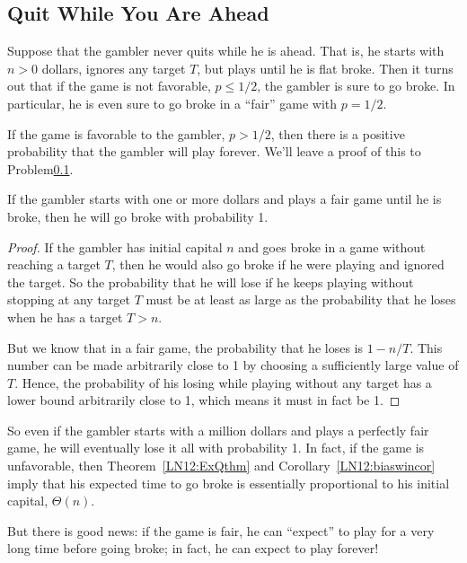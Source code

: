 \begin{editingnotes}

\subsection{Quit While You Are Ahead}

Suppose that the gambler never quits while he is ahead.  That is, he
starts with $n>0$ dollars, ignores any target $T$, but plays until he is
flat broke.  Then it turns out that if the game is not favorable, \ie $p
\leq 1/2$, the gambler is sure to go broke.  In particular, he is even
sure to go broke in a ``fair'' game with $p = 1/2$.

If the game is favorable to the gambler, \ie $p>1/2$, then there is a
positive probability that the gambler will play forever.  We'll leave a
proof of this to Problem\ref{}.

\begin{lemma}\label{LN12:go broke}
If the gambler starts with one or more dollars and plays a fair game until
he is broke, then he will go broke with probability 1.
\end{lemma}

\begin{proof}
If the gambler has initial capital $n$ and goes broke in a game without
reaching a target $T$, then he would also go broke if he were playing and
ignored the target.  So the probability that he will lose if he keeps
playing without stopping at any target $T$ must be at least as large as the
probability that he loses when he has a target $T>n$.

But we know that in a fair game, the probability that he loses is $1 -
n/T$.  This number can be made arbitrarily close to 1 by choosing a
sufficiently large value of $T$.  Hence, the probability of his losing
while playing without any target has a lower bound arbitrarily close to 1,
which means it must in fact be 1.
\end{proof}

So even if the gambler starts with a million dollars and plays a perfectly
fair game, he will eventually lose it all with probability 1.  In fact, if
the game is unfavorable, then Theorem~\ref{LN12:ExQthm} and
Corollary~\ref{LN12:biaswincor} imply that his expected time to go broke is
essentially proportional to his initial capital, \ie $\Theta(n)$.

But there is good news: if the game is fair, he can ``expect'' to play for
a very long time before going broke; in fact, he can expect to play
forever!


\end{editingnotes}
